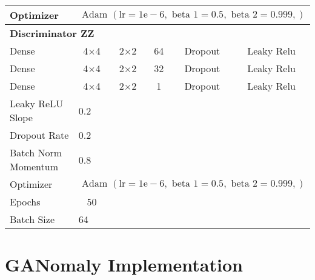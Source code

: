 \begin{longtable}[c]{@{}lccccc@{}}
	Optimizer & \multicolumn{5}{l}{$\text { Adam }(\mathrm{lr}=1 \mathrm{e}-6, \text { beta } 1=0.5, \text { beta } 2=0.999,)$} \\ \hline
	\multicolumn{6}{l}{\textbf{Discriminator ZZ}} \\
	Dense & \multicolumn{1}{c}{4$\times$4} & 2$\times$2 & 64 & Dropout & Leaky Relu \\
	Dense & \multicolumn{1}{c}{4$\times$4} & 2$\times$2 & 32 & Dropout & Leaky Relu \\
	Dense & \multicolumn{1}{c}{4$\times$4} & 2$\times$2 & 1 & Dropout & Leaky Relu \\ \hline
	Leaky ReLU Slope & \multicolumn{5}{l}{0.2} \\
	Dropout Rate & \multicolumn{5}{l}{0.2} \\
	Batch Norm Momentum & \multicolumn{5}{l}{0.8} \\
	Optimizer & \multicolumn{5}{l}{$\text { Adam }(\mathrm{lr}=1 \mathrm{e}-6, \text { beta } 1=0.5, \text { beta } 2=0.999,)$} \\ \hline
	Epochs & 50 & \multicolumn{1}{l}{} & \multicolumn{1}{l}{} & \multicolumn{1}{l}{} & \multicolumn{1}{l}{} \\
	Batch Size & \multicolumn{5}{l}{64}
\end{longtable}


\section{GANomaly Implementation}
\label{app:ganomaly}

